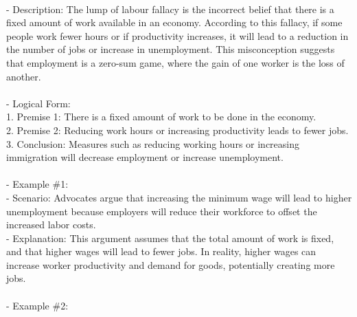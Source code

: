 \documentclass[a4paper,12pt,single,pdftex]{scrbook}
\begin{document}
    
      
    \\

    
      - Description: The lump of labour fallacy is the incorrect belief that there is a fixed amount of work available in an economy. According to this fallacy, if some people work fewer hours or if productivity increases, it will lead to a reduction in the number of jobs or increase in unemployment. This misconception suggests that employment is a zero-sum game, where the gain of one worker is the loss of another.
    \\

    
      
    \\

    
      - Logical Form:
    \\

    
        1. Premise 1: There is a fixed amount of work to be done in the economy.
    \\

    
        2. Premise 2: Reducing work hours or increasing productivity leads to fewer jobs.
    \\

    
        3. Conclusion: Measures such as reducing working hours or increasing immigration will decrease employment or increase unemployment.
    \\

    
      
    \\

    
      - Example \#1:
    \\

    
        - Scenario: Advocates argue that increasing the minimum wage will lead to higher unemployment because employers will reduce their workforce to offset the increased labor costs.
    \\

    
        - Explanation: This argument assumes that the total amount of work is fixed, and that higher wages will lead to fewer jobs. In reality, higher wages can increase worker productivity and demand for goods, potentially creating more jobs.
    \\

    
      
    \\

    
      - Example \#2:
    \\
\end{document}
